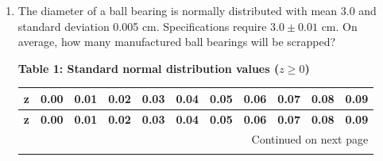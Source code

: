 \documentclass[12pt,a4paper]{article}
\newcommand{\yr}[1]{\hfill\textcolor{gray}{\small\textbf{[#1]}}}
\newcommand{\mk}[1]{\textcolor{orange!70!black}{\small\textbf{(#1 marks)}}}
\begin{document}
\begin{enumerate}
\mk{12} \yr{MATH 241 | L-2/T-1 | 2015--16}

\item The diameter of a ball bearing is normally distributed with mean 3.0 and standard deviation 0.005 cm. Specifications require $3.0\pm0.01$ cm. On average, how many manufactured ball bearings will be scrapped?


\begin{flushleft}
    \textbf{\Large Table 1: Standard normal distribution values ($z \ge 0$)}
\end{flushleft}
\vspace{0.2cm}

\begin{center}
\small %
\setlength{\tabcolsep}{4pt} %
\renewcommand{\arraystretch}{1.2} %

\begin{longtable}{c | cccccccccc}
\toprule
\textbf{z} & \textbf{0.00} & \textbf{0.01} & \textbf{0.02} & \textbf{0.03} & \textbf{0.04} & \textbf{0.05} & \textbf{0.06} & \textbf{0.07} & \textbf{0.08} & \textbf{0.09} \\
\midrule
\endfirsthead

\toprule
\textbf{z} & \textbf{0.00} & \textbf{0.01} & \textbf{0.02} & \textbf{0.03} & \textbf{0.04} & \textbf{0.05} & \textbf{0.06} & \textbf{0.07} & \textbf{0.08} & \textbf{0.09} \\
\midrule
\endhead

\midrule
\multicolumn{11}{r}{{Continued on next page}} \\
\bottomrule
\endfoot


\end{longtable}
\end{center}
\end{enumerate}
\end{document}
